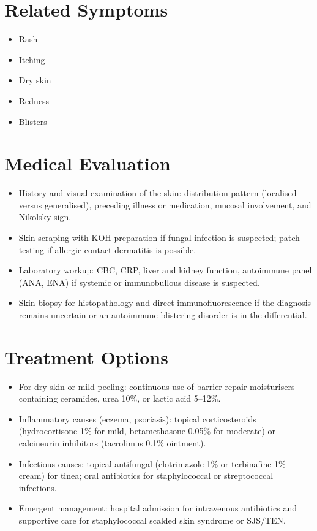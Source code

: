 \section*{Related Symptoms}
\begin{itemize}
  \item Rash
  \item Itching
  \item Dry skin
  \item Redness
  \item Blisters
\end{itemize}


\section*{Medical Evaluation}
\begin{itemize}
  \item History and visual examination of the skin: distribution pattern (localised versus generalised), preceding illness or medication, mucosal involvement, and Nikolsky sign.
  \item Skin scraping with KOH preparation if fungal infection is suspected; patch testing if allergic contact dermatitis is possible.
  \item Laboratory workup: CBC, CRP, liver and kidney function, autoimmune panel (ANA, ENA) if systemic or immunobullous disease is suspected.
  \item Skin biopsy for histopathology and direct immunofluorescence if the diagnosis remains uncertain or an autoimmune blistering disorder is in the differential.
\end{itemize}

\section*{Treatment Options}
\begin{itemize}
  \item For dry skin or mild peeling: continuous use of barrier repair moisturisers containing ceramides, urea 10\%, or lactic acid 5--12\%.
  \item Inflammatory causes (eczema, psoriasis): topical corticosteroids (hydrocortisone 1\% for mild, betamethasone 0.05\% for moderate) or calcineurin inhibitors (tacrolimus 0.1\% ointment).
  \item Infectious causes: topical antifungal (clotrimazole 1\% or terbinafine 1\% cream) for tinea; oral antibiotics for staphylococcal or streptococcal infections.
  \item Emergent management: hospital admission for intravenous antibiotics and supportive care for staphylococcal scalded skin syndrome or SJS/TEN.
\end{itemize}

